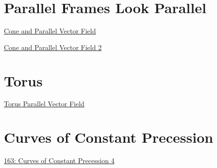 \documentclass{ximera}
\begin{document}
\section*{Parallel Frames Look Parallel}

\begin{exploration}
\begin{onlineOnly}
    \begin{center}
\end{center}
\end{onlineOnly}

\href{https://www.desmos.com/3d/jzp8zemhz6}{Cone and Parallel Vector Field}
\end{exploration}

\begin{exploration}
\begin{onlineOnly}
    \begin{center}
\end{center}
\end{onlineOnly}

\href{https://www.desmos.com/3d/2w08awnhab}{Cone and Parallel Vector Field 2}
\end{exploration}


\section*{Torus}

\begin{exploration}
\begin{onlineOnly}
    \begin{center}
\end{center}
\end{onlineOnly}

\href{https://www.desmos.com/3d/pkd5ztemml}{Torus Parallel Vector Field}
\end{exploration}



\section*{Curves of Constant Precession}

\begin{exploration}
\begin{onlineOnly}
    \begin{center}
\end{center}
\end{onlineOnly}

\href{https://www.desmos.com/3d/nsifyzlx3p}{163: Curves of Constant Precession 4}
\end{exploration}
\end{document}
